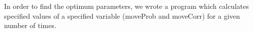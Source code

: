 
In order to find the optimum parameters, we wrote a program which calculates specified values of a specified variable (moveProb and moveCorr) for a given number of times.